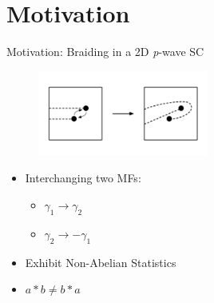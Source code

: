 \documentclass[xcolor=dvipsnames,10pt,aspectratio=169]{beamer}
\newcommand{\MO}{Motivation}
\begin{document}
  \section{\MO}

  \begin{frame}{\MO: Braiding in a 2D \textit{p}-wave SC}
    \begin{multicols}{2}
      \begin{figure}
        \includegraphics[width=0.5\textwidth]{./figures/pwave-braid.pdf}
      \end{figure}

      \begin{itemize}
          \item Interchanging two MFs:
          \begin{itemize}
            \item[] $\gamma_1 \rightarrow \gamma_2$ \\
            \item[] $\gamma_2 \rightarrow -\gamma_1$ \\
          \end{itemize}
          \item Exhibit Non-Abelian Statistics
          \item $a \ast b \neq b \ast a$
      \end{itemize}
      \begin{equation*}
      \end{equation*}
      \vspace{20pt}


\end{multicols}
\end{frame}
\end{document}
